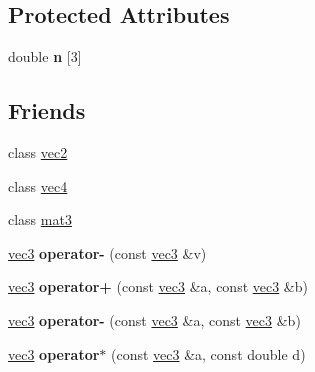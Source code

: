 \subsection*{Protected Attributes}
\begin{DoxyCompactItemize}
\item 
\hypertarget{classvec3_ac1d4ba76cfdd83d484c945a7cf1195f1}{
double {\bfseries n} \mbox{[}3\mbox{]}}
\label{classvec3_ac1d4ba76cfdd83d484c945a7cf1195f1}

\end{DoxyCompactItemize}
\subsection*{Friends}
\begin{DoxyCompactItemize}
\item 
\hypertarget{classvec3_a15a2529e420e1a5cb94508d6a5a57d1e}{
class \hyperlink{classvec3_a15a2529e420e1a5cb94508d6a5a57d1e}{vec2}}
\label{classvec3_a15a2529e420e1a5cb94508d6a5a57d1e}

\item 
\hypertarget{classvec3_aa6e6ead6159bde48f1607d4208122d9d}{
class \hyperlink{classvec3_aa6e6ead6159bde48f1607d4208122d9d}{vec4}}
\label{classvec3_aa6e6ead6159bde48f1607d4208122d9d}

\item 
\hypertarget{classvec3_a036449d0093edd0ad304c94ce9eeb531}{
class \hyperlink{classvec3_a036449d0093edd0ad304c94ce9eeb531}{mat3}}
\label{classvec3_a036449d0093edd0ad304c94ce9eeb531}

\item 
\hypertarget{classvec3_ad57f6a85dd0416a336c6d6bbbfdf5441}{
\hyperlink{classvec3}{vec3} {\bfseries operator-\/} (const \hyperlink{classvec3}{vec3} \&v)}
\label{classvec3_ad57f6a85dd0416a336c6d6bbbfdf5441}

\item 
\hypertarget{classvec3_a5d7987568bb8292df33b422665fd73f8}{
\hyperlink{classvec3}{vec3} {\bfseries operator+} (const \hyperlink{classvec3}{vec3} \&a, const \hyperlink{classvec3}{vec3} \&b)}
\label{classvec3_a5d7987568bb8292df33b422665fd73f8}

\item 
\hypertarget{classvec3_a8bc7975c3f566dfa7410c96d8d91f52f}{
\hyperlink{classvec3}{vec3} {\bfseries operator-\/} (const \hyperlink{classvec3}{vec3} \&a, const \hyperlink{classvec3}{vec3} \&b)}
\label{classvec3_a8bc7975c3f566dfa7410c96d8d91f52f}

\item 
\hypertarget{classvec3_adb4f55df9662f801ca5953402467f30c}{
\hyperlink{classvec3}{vec3} {\bfseries operator$\ast$} (const \hyperlink{classvec3}{vec3} \&a, const double d)}
\label{classvec3_adb4f55df9662f801ca5953402467f30c}


\end{DoxyCompactItemize}

